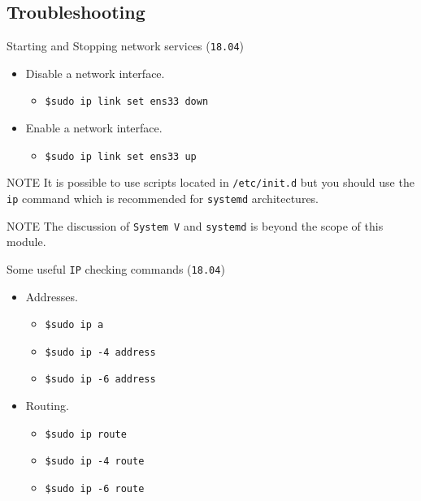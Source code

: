 \documentclass{beamer}
\begin{document}
\subsection{Troubleshooting}
\begin{frame}{Starting and Stopping network services (\texttt{18.04})}
  \begin{itemize}
    \item Disable a network interface.
    \begin{itemize}
      \item \texttt{\$sudo ip link set ens33 down}
    \end{itemize}
  \end{itemize}
  \begin{itemize}
    \item Enable a network interface.
    \begin{itemize}
      \item \texttt{\$sudo ip link set ens33 up}
    \end{itemize}
  \end{itemize}
  \begin{block}{NOTE}
    It is possible to use scripts located in \texttt{/etc/init.d} but you should use the \texttt{ip} command which is recommended for \texttt{systemd} architectures.  
  \end{block}
  \begin{block}{NOTE}
    The discussion of \texttt{System V} and \texttt{systemd} is beyond the scope of this module.  
  \end{block}
\end{frame}

\begin{frame}{Some useful \texttt{IP} checking commands (\texttt{18.04})}
  \begin{itemize}
    \item Addresses.
    \begin{itemize}
      \item \texttt{\$sudo ip a}
      \item \texttt{\$sudo ip -4 address}
      \item \texttt{\$sudo ip -6 address}
    \end{itemize}
    \item Routing.
    \begin{itemize}
      \item \texttt{\$sudo ip route}
      \item \texttt{\$sudo ip -4 route}
      \item \texttt{\$sudo ip -6 route}
    \end{itemize}
  \end{itemize}
\end{frame}
\end{document}
